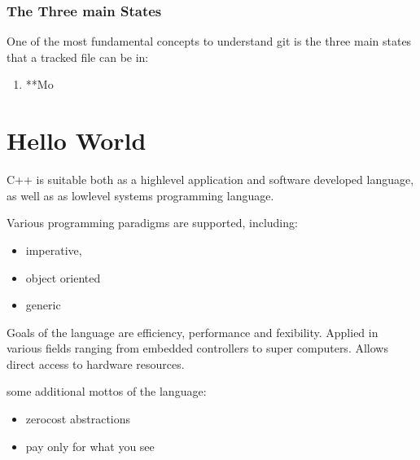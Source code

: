 \documentclass[a4paper,10pt,english]{jupyterBook}
\begin{document}
\subsection{The Three main States}
\label{\detokenize{text/progtut/gitbasic:the-three-main-states}}
\sphinxAtStartPar
One of the most fundamental concepts to understand git is the three main states that a tracked file can be in:
\begin{enumerate}
%
\item {} 
\sphinxAtStartPar
**Mo

\end{enumerate}

\sphinxstepscope


\chapter{Hello World}
\label{\detokenize{text/progtut/hello:hello-world}}\label{\detokenize{text/progtut/hello::doc}}
\sphinxAtStartPar
C++ is suitable both as a high\sphinxhyphen{}level application and software developed language, as well as as low\sphinxhyphen{}level systems programming language.

\sphinxAtStartPar
Various programming paradigms are supported, including:
\begin{itemize}
\item {} 
\sphinxAtStartPar
imperative,

\item {} 
\sphinxAtStartPar
object oriented

\item {} 
\sphinxAtStartPar
generic

\end{itemize}

\sphinxAtStartPar
Goals of the language are efficiency, performance and fexibility.
Applied in various fields ranging from embedded controllers to super computers.
Allows direct access to hardware resources.

\sphinxAtStartPar
some additional mottos of the language:
\begin{itemize}
\item {} 
\sphinxAtStartPar
zero\sphinxhyphen{}cost abstractions

\item {} 
\sphinxAtStartPar
pay only for what you see

\end{itemize}
\end{document}
